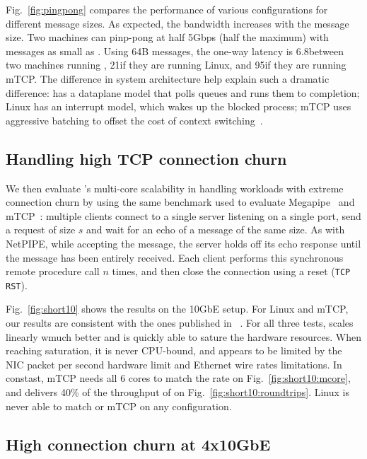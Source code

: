 \edb Fig.~\ref{fig:pingpong} compares the performance of various
configurations for different message sizes.  As expected, the
bandwidth increases with the message size. Two \ix machines can
pinp-pong at half 5Gbps (half the maximum) with messages as small as
.  Using 64B messages, the one-way latency is 
6.8\microsecond between two machines running \ix, 21\microsecond if
they are running Linux, and 95\microsecond if they are running mTCP.
The difference in system architecture help explain such a dramatic
difference: \ix has a dataplane model that polls queues and runs them
to completion; Linux has an interrupt model, which wakes up the
blocked process; mTCP uses aggressive batching to offset the cost of context switching~\cite{jeong2014mtcp}.

\subsection{Handling high TCP connection churn}
\label{sec:eval:short}


We then evaluate \ix's multi-core scalability in handling workloads
with extreme connection churn by using the same benchmark used to evaluate
Megapipe~\cite{han2012megapipe} and mTCP~\cite{jeong2014mtcp}:
multiple clients connect to a single server listening on a single
port, send a request of size $s$ and wait for an echo of a message of
the same size.  As with NetPIPE, while accepting the message, the server holds off its
echo response until the message has been entirely received.
Each client performs this synchronous remote procedure
call $n$ times, and then close the connection using a reset
(\texttt{TCP RST}).




Fig.~\ref{fig:short10} shows the results on the 10GbE setup.  For
Linux and mTCP, our results are consistent with the ones published in
~\cite{jeong2014mtcp}.  For all three tests, \ix scales linearly wmuch better
and is quickly able to sature the hardware resources.  When reaching
saturation, it is never CPU-bound, and appears to be limited by the
NIC packet per second hardware limit and Ethernet wire rates
limitations.  In constast, mTCP needs all 6 cores to match the rate on
Fig.~\ref{fig:short10:mcore}, and delivers 40\% of the throughput of
\ix on Fig.~\ref{fig:short10:roundtrips}.  Linux is never able to
match \ix or mTCP on any configuration.


\subsection{High connection churn at 4x10GbE}
\label{sec:eval:short40}

